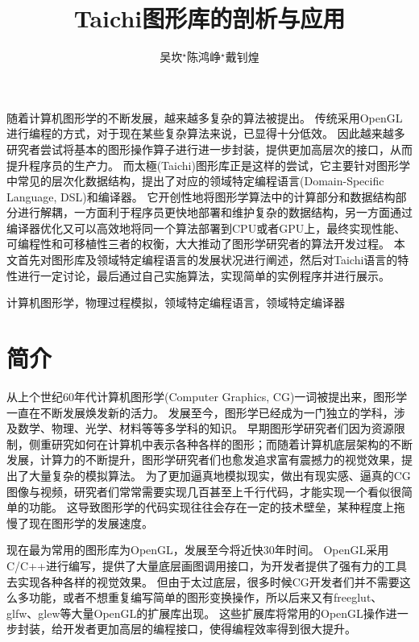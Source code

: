 \documentclass[thesis]{thesis}
\title{Taichi图形库的剖析与应用}
\author{吴坎$^\star$\qquad 陈鸿峥$^\star$\qquad 戴钊煌}
\begin{document}
	
\maketitle
	
\begin{abstractchinese}
随着计算机图形学的不断发展，越来越多复杂的算法被提出。
传统采用OpenGL进行编程的方式，对于现在某些复杂算法来说，已显得十分低效。
因此越来越多研究者尝试将基本的图形操作算子进行进一步封装，提供更加高层次的接口，从而提升程序员的生产力。
而太極(Taichi)图形库正是这样的尝试，它主要针对图形学中常见的层次化数据结构，提出了对应的领域特定编程语言(Domain-Specific Language, DSL)和编译器。
它开创性地将图形学算法中的计算部分和数据结构部分进行解耦，一方面利于程序员更快地部署和维护复杂的数据结构，另一方面通过编译器优化又可以高效地将同一个算法部署到CPU或者GPU上，最终实现性能、可编程性和可移植性三者的权衡，大大推动了图形学研究者的算法开发过程。
本文首先对图形库及领域特定编程语言的发展状况进行阐述，然后对Taichi语言的特性进行一定讨论，最后通过自己实施算法，实现简单的实例程序并进行展示。
\end{abstractchinese}
\begin{keywordchinese}
计算机图形学，物理过程模拟，领域特定编程语言，领域特定编译器
\end{keywordchinese}

\section{简介}
从上个世纪60年代计算机图形学(Computer Graphics, CG)一词被提出来，图形学一直在不断发展焕发新的活力。
发展至今，图形学已经成为一门独立的学科，涉及数学、物理、光学、材料等等多学科的知识。
早期图形学研究者们因为资源限制，侧重研究如何在计算机中表示各种各样的图形；而随着计算机底层架构的不断发展，计算力的不断提升，图形学研究者们也愈发追求富有震撼力的视觉效果，提出了大量复杂的模拟算法。
为了更加逼真地模拟现实，做出有现实感、逼真的CG图像与视频，研究者们常常需要实现几百甚至上千行代码，才能实现一个看似很简单的功能。
这导致图形学的代码实现往往会存在一定的技术壁垒，某种程度上拖慢了现在图形学的发展速度。

现在最为常用的图形库为OpenGL\cite{opengl}，发展至今将近快30年时间。
OpenGL采用C/C++进行编写，提供了大量底层画图调用接口，为开发者提供了强有力的工具去实现各种各样的视觉效果。
但由于太过底层，很多时候CG开发者们并不需要这么多功能，或者不想重复编写简单的图形变换操作，所以后来又有freeglut\cite{freeglut}、glfw\cite{glfw}、glew\cite{glew}等大量OpenGL的扩展库出现。
这些扩展库将常用的OpenGL操作进一步封装，给开发者更加高层的编程接口，使得编程效率得到很大提升。
\end{document}
